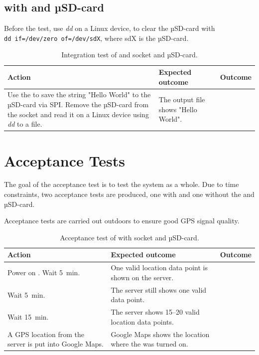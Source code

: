 \subsection{\MKR with \SDsock and µSD-card}
Before the test, use \textit{dd} on a Linux device, to clear the µSD-card with\\
\texttt{dd if=/dev/zero of=/dev/sdX}, where sdX is the µSD-card.

\begin{table}[H]
	\centering
	\begin{tabularx}{\textwidth}{p{4.3cm} X X}
		\toprule
		\textbf{Action} & \textbf{Expected outcome} & \textbf{Outcome} \\
		\midrule
		Use the \MKR to save the string "Hello World" to the µSD-card via SPI.
		Remove the µSD-card from the \SDsock socket and read it on a Linux device using \textit{dd} to a file. & The output file shows "Hello World". & \\
		\bottomrule
	\end{tabularx}
	\caption{Integration test of \MKR and \SDsock socket and µSD-card.}
	\label{AT:intSD}
\end{table}

\section{Acceptance Tests}
The goal of the acceptance test is to test the system as a whole.
Due to time constraints, two acceptance tests are produced, one with and one without the \SDsock and µSD-card.

Acceptance tests are carried out outdoors to ensure good GPS signal quality.

\begin{table}[H]
	\centering
	\begin{tabularx}{\textwidth}{p{4.3cm} X X}
		\toprule
		\textbf{Action} & \textbf{Expected outcome} & \textbf{Outcome} \\
		\midrule
		Power on \systemName. Wait \SI{5}{\minute}. & One valid location data point is shown on the server. & \\
		Wait \SI{5}{\minute}. & The server still shows one valid data point. & \\
		Wait \SI{15}{\minute}. & The server shows \numrange{15}{20} valid location data points. & \\
		A GPS location from the server is put into Google Maps. & Google Maps shows the location where the \systemName was turned on. & \\
		\bottomrule
	\end{tabularx}
	\caption{Acceptance test of \systemName with  \SDsock socket and µSD-card.}
	\label{AT:withSD}
\end{table}

